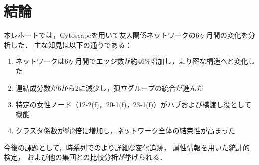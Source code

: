 \section{結論}

本レポートでは，Cytoscapeを用いて友人関係ネットワークの6ヶ月間の変化を分析した．
主な知見は以下の通りである：

\begin{enumerate}
  \item ネットワークは6ヶ月間でエッジ数が約46\%増加し，より密な構造へと変化した
  \item 連結成分数が6から2に減少し，孤立グループの統合が進んだ
  \item 特定の女性ノード（12-2(f)，20-1(f)，23-1(f)）がハブおよび橋渡し役として機能
  \item クラスタ係数が約2倍に増加し，ネットワーク全体の結束性が高まった
\end{enumerate}

今後の課題として，時系列でのより詳細な変化追跡，
属性情報を用いた統計的検定，
および他の集団との比較分析が挙げられる．
